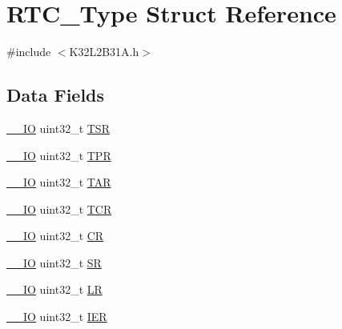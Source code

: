\hypertarget{struct_r_t_c___type}{}\section{R\+T\+C\+\_\+\+Type Struct Reference}
\label{struct_r_t_c___type}


{\ttfamily \#include $<$K32\+L2\+B31\+A.\+h$>$}

\subsection*{Data Fields}
\begin{DoxyCompactItemize}
\item 
\mbox{\hyperlink{core__cm0plus_8h_aec43007d9998a0a0e01faede4133d6be}{\+\_\+\+\_\+\+IO}} uint32\+\_\+t \mbox{\hyperlink{struct_r_t_c___type_a87e3001757a0cd493785f1f3337dd0e8}{T\+SR}}
\item 
\mbox{\hyperlink{core__cm0plus_8h_aec43007d9998a0a0e01faede4133d6be}{\+\_\+\+\_\+\+IO}} uint32\+\_\+t \mbox{\hyperlink{struct_r_t_c___type_a72bb9b7d61fe3262cd2a6070a7bd5b69}{T\+PR}}
\item 
\mbox{\hyperlink{core__cm0plus_8h_aec43007d9998a0a0e01faede4133d6be}{\+\_\+\+\_\+\+IO}} uint32\+\_\+t \mbox{\hyperlink{struct_r_t_c___type_a98069e908f0dbdf30857c4c33e5680b8}{T\+AR}}
\item 
\mbox{\hyperlink{core__cm0plus_8h_aec43007d9998a0a0e01faede4133d6be}{\+\_\+\+\_\+\+IO}} uint32\+\_\+t \mbox{\hyperlink{struct_r_t_c___type_ae9dd9282fab299d0cd6e119564688e53}{T\+CR}}
\item 
\mbox{\hyperlink{core__cm0plus_8h_aec43007d9998a0a0e01faede4133d6be}{\+\_\+\+\_\+\+IO}} uint32\+\_\+t \mbox{\hyperlink{struct_r_t_c___type_ab40c89c59391aaa9d9a8ec011dd0907a}{CR}}
\item 
\mbox{\hyperlink{core__cm0plus_8h_aec43007d9998a0a0e01faede4133d6be}{\+\_\+\+\_\+\+IO}} uint32\+\_\+t \mbox{\hyperlink{struct_r_t_c___type_af6aca2bbd40c0fb6df7c3aebe224a360}{SR}}
\item 
\mbox{\hyperlink{core__cm0plus_8h_aec43007d9998a0a0e01faede4133d6be}{\+\_\+\+\_\+\+IO}} uint32\+\_\+t \mbox{\hyperlink{struct_r_t_c___type_a7006c26539198fbc8729e0386bffdd40}{LR}}
\item 
\mbox{\hyperlink{core__cm0plus_8h_aec43007d9998a0a0e01faede4133d6be}{\+\_\+\+\_\+\+IO}} uint32\+\_\+t \mbox{\hyperlink{struct_r_t_c___type_a6566f8cfbd1d8aa7e8db046aa35e77db}{I\+ER}}
\end{DoxyCompactItemize}



